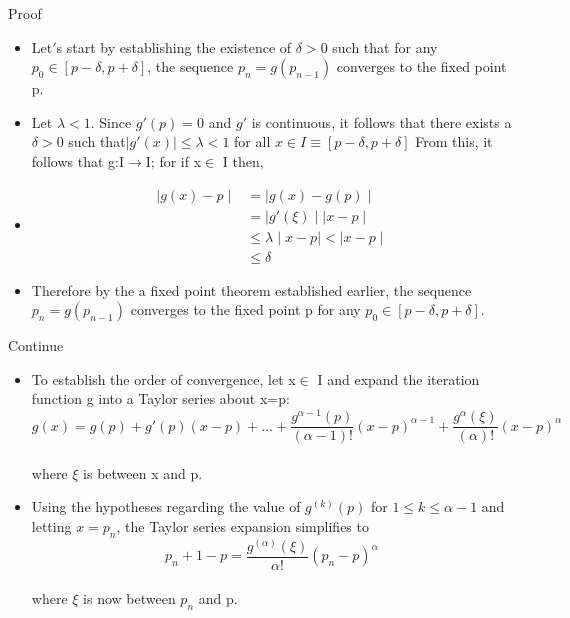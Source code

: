 \documentclass{beamer}
\begin{document}
\begin{frame}

\begin{block}{Proof}
\begin{itemize}


\item[]<1->Let$'$s start by establishing the existence of $\delta>0$ such that for any $p_0\in [p-\delta,p+\delta]$, the sequence $p_n=g(p_{n-1})$ converges to the fixed point p.

\item[]<2->Let $\lambda<1$. Since $g'(p)=0$ and $g'$ is continuous, it follows that there exists a $\delta>0$ such that$\mid g'(x)\mid\le \lambda<1$ for all $x\in I \equiv[p-\delta,p+\delta]$ From this, it follows that g:I$\rightarrow$I; for if x$\in$ I then,
\item[]<3->
\begin{align*}
\mid g(x)-p\mid&=\mid g(x)-g(p)\mid\\
&=\mid g'(\xi)\mid\mid x-p\mid\\
&\le \lambda\mid x-p\mid<\mid x-p\mid\\
&\le\delta
\end{align*}
\item[]<4->Therefore by the a fixed point theorem established earlier, the sequence $p_n=g(p_{n-1})$ converges to the fixed point p for any $p_0\in [p-\delta,p+\delta]$.

\end{itemize}
\end{block}

\vskip 1cm

\end{frame}



\begin{frame}

\begin{block}{Continue}
\begin{itemize}


\item[]<1->To establish the order of convergence, let x$\in$ I and expand the iteration function g into a Taylor series about x=p:
$$g(x)=g(p)+g'(p)(x-p)+...+\frac{g^{\alpha-1}(p)}{(\alpha-1)!}(x-p)^{\alpha-1}+\frac{g^{\alpha}(\xi)}{(\alpha)!}(x-p)^{\alpha}$$ 
\\where $\xi$ is between x and p. 
\item[]<2->Using the hypotheses regarding the value of $g^{(k)}(p)$ for $1\le k\le \alpha-1$ and letting $x=p_n$, the Taylor series expansion simplifies to $$p_n+1-p=\frac{g^(\alpha)(\xi)}{\alpha!}(p_n-p)^\alpha$$
\\where $\xi$ is now between $p_n$ and p.

\end{itemize}
\end{block}

\vskip 1cm

\end{frame}
\end{document}
